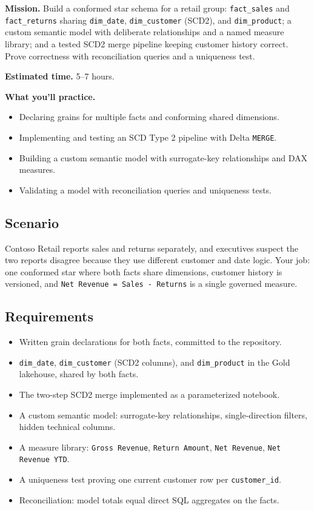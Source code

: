 \begin{capstonebox}
\textbf{Mission.} Build a conformed star schema for a retail group: \texttt{fact\_sales} and \texttt{fact\_returns} sharing \texttt{dim\_date}, \texttt{dim\_customer} (SCD2), and \texttt{dim\_product}; a custom semantic model with deliberate relationships and a named measure library; and a tested SCD2 merge pipeline keeping customer history correct. Prove correctness with reconciliation queries and a uniqueness test.

\textbf{Estimated time.} 5--7 hours.

\textbf{What you'll practice.}
\begin{itemize}
    \item Declaring grains for multiple facts and conforming shared dimensions.
    \item Implementing and testing an SCD Type 2 pipeline with Delta \texttt{MERGE}.
    \item Building a custom semantic model with surrogate-key relationships and DAX measures.
    \item Validating a model with reconciliation queries and uniqueness tests.
\end{itemize}
\end{capstonebox}

\subsection*{Scenario}
Contoso Retail reports sales and returns separately, and executives suspect the two reports disagree because they use different customer and date logic. Your job: one conformed star where both facts share dimensions, customer history is versioned, and \texttt{Net Revenue = Sales - Returns} is a single governed measure.

\subsection*{Requirements}
\begin{itemize}
    \item Written grain declarations for both facts, committed to the repository.
    \item \texttt{dim\_date}, \texttt{dim\_customer} (SCD2 columns), and \texttt{dim\_product} in the Gold lakehouse, shared by both facts.
    \item The two-step SCD2 merge implemented as a parameterized notebook.
    \item A custom semantic model: surrogate-key relationships, single-direction filters, hidden technical columns.
    \item A measure library: \texttt{Gross Revenue}, \texttt{Return Amount}, \texttt{Net Revenue}, \texttt{Net Revenue YTD}.
    \item A uniqueness test proving one current customer row per \texttt{customer\_id}.
    \item Reconciliation: model totals equal direct SQL aggregates on the facts.
\end{itemize}

